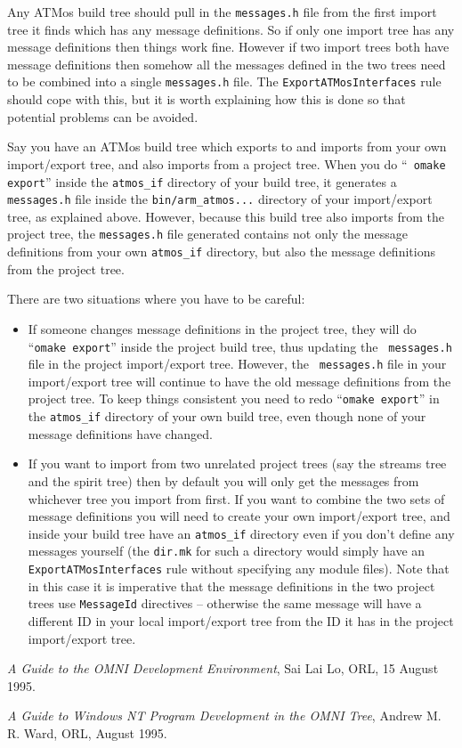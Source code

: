\documentclass[11pt,twoside,onecolumn]{article}
\begin{document}
Any ATMos build tree should pull in the \verb|messages.h| file from the first
import tree it finds which has any message definitions.  So if only one import
tree has any message definitions then things work fine.  However if two import
trees both have message definitions then somehow all the messages defined in
the two trees need to be combined into a single \verb|messages.h| file.  The
{\tt ExportATMosInterfaces} rule should cope with this, but it is worth
explaining how this is done so that potential problems can be avoided.

Say you have an ATMos build tree which exports to and imports from your own
import/export tree, and also imports from a project tree.  When you do ``{\tt
omake export}'' inside the \verb|atmos_if| directory of your build tree, it
generates a {\tt messages.h} file inside the \verb|bin/arm_atmos...| directory
of your import/export tree, as explained above.  However, because this build
tree also imports from the project tree, the {\tt messages.h} file generated
contains not only the message definitions from your own \verb|atmos_if|
directory, but also the message definitions from the project tree.

There are two situations where you have to be careful:

\begin{itemize}

\item If someone changes message definitions in the project tree, they will do
``{\tt omake export}'' inside the project build tree, thus updating the {\tt
messages.h} file in the project import/export tree.  However, the {\tt
messages.h} file in your import/export tree will continue to have the old
message definitions from the project tree.  To keep things consistent you need
to redo ``{\tt omake export}'' in the \verb|atmos_if| directory of your own
build tree, even though none of your message definitions have changed.

\item If you want to import from two unrelated project trees (say the streams
tree and the spirit tree) then by default you will only get the messages from
whichever tree you import from first.  If you want to combine the two sets of
message definitions you will need to create your own import/export tree, and
inside your build tree have an \verb|atmos_if| directory even if you don't
define any messages yourself (the {\tt dir.mk} for such a directory would
simply have an {\tt ExportATMosInterfaces} rule without specifying any module
files).  Note that in this case it is imperative that the message definitions
in the two project trees use {\tt MessageId} directives -- otherwise the same
message will have a different ID in your local import/export tree from the ID
it has in the project import/export tree.

\end{itemize}


\begin{thebibliography}{ward95}

{\em A Guide to the OMNI Development Environment},
Sai Lai Lo, ORL, 15 August 1995.

{\em A Guide to Windows NT Program Development in the OMNI Tree},
Andrew M. R. Ward, ORL, August 1995.

\end{thebibliography}
\end{document}

